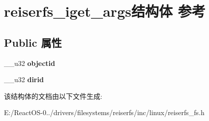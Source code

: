 \hypertarget{structreiserfs__iget__args}{}\section{reiserfs\+\_\+iget\+\_\+args结构体 参考}
\label{structreiserfs__iget__args}
\subsection*{Public 属性}
\begin{DoxyCompactItemize}
\item 
\mbox{\label{structreiserfs__iget__args_a91abb1ba0bec5784c31c250c844f832a}} 
\+\_\+\+\_\+u32 {\bfseries objectid}
\item 
\mbox{\label{structreiserfs__iget__args_a86a910f9d2dfb584992bacbb125f4c45}} 
\+\_\+\+\_\+u32 {\bfseries dirid}
\end{DoxyCompactItemize}


该结构体的文档由以下文件生成\+:\begin{DoxyCompactItemize}
\item 
E\+:/\+React\+O\+S-\/0../drivers/filesystems/reiserfs/inc/linux/reiserfs\+\_\+fs.\+h\end{DoxyCompactItemize}
